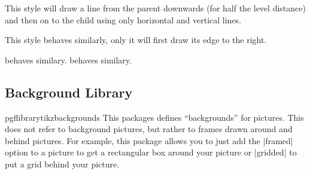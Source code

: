 \begin{itemize}
  This style will draw a line from the parent downwards (for half the
  level distance) and then on to the child using only horizontal and
  vertical lines. 
\begin{codeexample}[]
\end{codeexample}
  This style behaves similarly, only it will first draw its edge to
  the right.
\begin{codeexample}[]
\end{codeexample}
  behaves similary. 
  behaves similary. 
\end{itemize}



\subsection{Background Library}

\label{section-tikz-backgrounds}

\begin{package}{pgflibrarytikzbackgrounds}
  This packages defines ``backgrounds'' for pictures. This does not
  refer to background pictures, but rather to frames drawn around and
  behind pictures. For example, this package allows you to just add
  the |framed| option to a picture to get a rectangular box around
  your picture or |gridded| to put a grid behind your picture.
\end{package}

